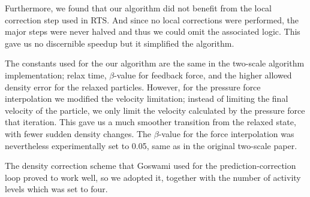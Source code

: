 \documentclass[../../main.tex]{subfiles}
\begin{document}
Furthermore, we found that our algorithm did not benefit from the local correction step used in RTS. And since no local corrections were performed, the major steps were never halved and thus we could omit the associated logic. This gave us no discernible speedup but it simplified the algorithm. 

The constants used for the our algorithm are the same in the two-scale algorithm implementation; relax time, $\beta$-value for feedback force, and the higher allowed density error for the relaxed particles. However, for the pressure force interpolation we modified the velocity limitation; instead of limiting the final velocity of the particle, we only limit the velocity calculated by the pressure force that iteration. This gave us a much smoother transition from the relaxed state, with fewer sudden density changes. The $\beta$-value for the force interpolation was nevertheless experimentally set to 0.05, same as in the original two-scale paper. 

The density correction scheme that Goswami used for the prediction-correction loop proved to work well, so we adopted it, together with the number of activity levels which was set to four. 


\end{document}
